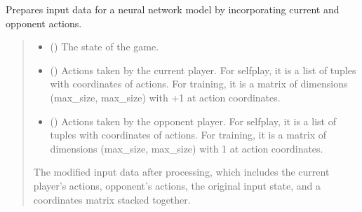 \documentclass[letterpaper,10pt,english]{sphinxmanual}
\begin{document}
\begin{fulllineitems}
\begin{fulllineitems}
\label{\detokenize{modules:Resnet.ResNet.prepare_data}}
\pysigstartsignatures
{}
\pysigstopsignatures
\sphinxAtStartPar
Prepares input data for a neural network model by incorporating current and opponent actions.
\begin{quote}\begin{description}
\begin{itemize}
\item {} 
\sphinxAtStartPar
{} () \textendash{} The state of the game.

\item {} 
\sphinxAtStartPar
{} (\sphinxstyleliteralemphasis{\sphinxupquote{, }}) \textendash{} Actions taken by the current player. For self\sphinxhyphen{}play, it is a list of tuples with coordinates of actions.
For training, it is a matrix of dimensions (max\_size, max\_size) with +1 at action coordinates.

\item {} 
\sphinxAtStartPar
{} (\sphinxstyleliteralemphasis{\sphinxupquote{, }}) \textendash{} Actions taken by the opponent player. For self\sphinxhyphen{}play, it is a list of tuples with coordinates of actions.
For training, it is a matrix of dimensions (max\_size, max\_size) with \sphinxhyphen{}1 at action coordinates.

\end{itemize}

\sphinxAtStartPar
The modified input data after processing, which includes the current player’s actions, opponent’s actions,
the original input state, and a coordinates matrix stacked together.


\end{description}
\end{quote}
\end{fulllineitems}
\end{fulllineitems}
\end{document}
